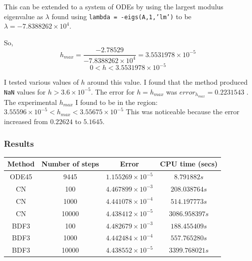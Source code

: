 \documentclass[a4paper, 11pt]{article}
\begin{document}
				This can be extended to a system of ODEs by using the largest modulus eigenvalue as $ \lambda $ found using \texttt{lambda = -eigs(A,1,’lm’)} to be $ \lambda = -7.8388262\times 10^{4} $.		
				
				So, 
				\begin{equation}
					h_{max} = \frac{-2.78529}{-7.8388262\times 10^{4}} = 3.5531978\times 10^{-5} 
				\end{equation}
				\begin{equation}
					0 < h < 3.5531978\times 10^{-5} 
				\end{equation}
			 
				
				I tested various values of $h$ around this value. 
				I found that the method produced \texttt{NaN} values for $h > 3.6\times 10^{-5} $.
				The error for $ h = h_{max}$ was $error_{h_{max}} = 0.2231543$ .
				The experimental $h_{max}$ I found to be in the region: $ 3.55596 \times 10^{-5} < h_{max} < 3.55675 \times 10^{-5}$
				This was noticeable because the error increased from $ 0.22624 $ to $ 5.1645 $.
				
				
		\subsubsection*{Results}
			\begin{table}[H]
				\centering
				\begin{tabular}{c|c|c|c}
					\textbf{Method} & \textbf{Number of steps} 	& \textbf{Error}  				& \textbf{CPU time (secs)}  	\\ \hline
					ODE45 			& 9445 						& $ 1.155269\times 10^{-5} $ 	& $ 8.791882 s $ 	\\ \hline 
					CN 				& 100 						& $ 4.467899\times 10^{-3} $ 	& $ 208.038764 s $ 				\\ \hline
					CN 				& 1000 						& $ 4.441078\times 10^{-4} $ 	& $ 514.197773 s $ 				\\ \hline
					CN 				& 10000 					& $ 4.438412\times 10^{-5} $ 	& $ 3086.958397 s $				\\ \hline
					BDF3 			& 100				 		& $ 4.482679\times 10^{-3} $ 	& $ 188.455409 s $ 				\\ \hline
					BDF3 			& 1000						& $ 4.442484\times 10^{-4} $ 	& $ 557.765280 s $ 				\\ \hline
					BDF3 			& 10000 					& $ 4.438552\times 10^{-5} $ 	& $ 3399.768021 s $ 			\\ \hline
				\end{tabular}
			\end{table}
	
\end{document}
